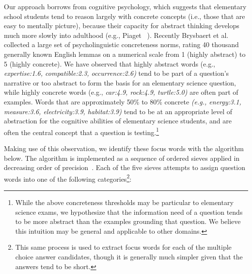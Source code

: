 Our approach borrows from cognitive psychology, which suggests that elementary school students tend to reason largely with concrete concepts (i.e., those that are easy to mentally picture), because their capacity for abstract thinking develops much more slowly into adulthood (e.g., Piaget ~).  Recently Brysbaert et al. ~ collected a large set of psycholinguistic concreteness norms, rating 40 thousand generally known English lemmas on a numerical scale from 1 (highly abstract) to 5 (highly concrete).  We have observed that highly abstract words (e.g., {\em expertise:1.6, compatible:2.3, occurrence:2.6)} tend to be part of a question's narrative or too abstract to form the basis for an elementary science question, while highly concrete words (e.g., {\em  car:4.9, rock:4.9, turtle:5.0)} are often part of examples.  Words that are approximately 50\% to 80\% concrete {\em (e.g., energy:3.1, measure:3.6, electricity:3.9, habitat:3.9)} tend to be at an appropriate level of abstraction for the cognitive abilities of elementary science students, and are often the central concept that a question is testing.\footnote{
While the above concreteness thresholds may be particular to elementary science exams, we hypothesize that the information need of a question tends to be more abstract than the examples grounding that question.  We believe this intuition may be general and applicable to other domains.
}

Making use of this observation, we identify these focus words with the algorithm below. The algorithm is implemented as a sequence of ordered sieves applied in decreasing order of precision~\cite{Lee:13}. Each of the five sieves attempts to assign question words into one of the following categories\footnote{This same process is used to extract focus words for each of the multiple choice answer candidates, though it is generally much simpler given that the answers tend to be short.}: 

